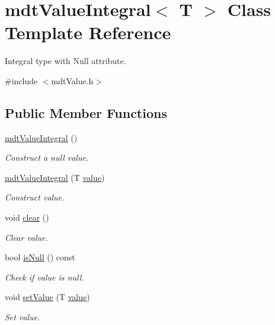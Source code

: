 \hypertarget{classmdt_value_integral}{\section{mdt\-Value\-Integral$<$ T $>$ Class Template Reference}
\label{classmdt_value_integral}
}


Integral type with Null attribute.  




{\ttfamily \#include $<$mdt\-Value.\-h$>$}

\subsection*{Public Member Functions}
\begin{DoxyCompactItemize}
\item 
\hyperlink{classmdt_value_integral_aa359c20f58c0410de59e42bbbdd1d1f2}{mdt\-Value\-Integral} ()
\begin{DoxyCompactList}\small\item\em Construct a null value. \end{DoxyCompactList}\item 
\hyperlink{classmdt_value_integral_ab795206b1dde3a8e69cef52d7f3b59e9}{mdt\-Value\-Integral} (T \hyperlink{classmdt_value_integral_aae3159993261e0ba5d1a4a3e53bb207d}{value})
\begin{DoxyCompactList}\small\item\em Construct value. \end{DoxyCompactList}\item 
void \hyperlink{classmdt_value_integral_a8879146daa893dbcdac4e118f3993c91}{clear} ()
\begin{DoxyCompactList}\small\item\em Clear value. \end{DoxyCompactList}\item 
bool \hyperlink{classmdt_value_integral_a7206a19a6d3ef12330a327d0ccfb5188}{is\-Null} () const 
\begin{DoxyCompactList}\small\item\em Check if value is null. \end{DoxyCompactList}\item 
void \hyperlink{classmdt_value_integral_aef2001d3897a074150c5e38706177ca8}{set\-Value} (T \hyperlink{classmdt_value_integral_aae3159993261e0ba5d1a4a3e53bb207d}{value})
\begin{DoxyCompactList}\small\item\em Set value. \end{DoxyCompactList}\item 

\end{DoxyCompactItemize}
